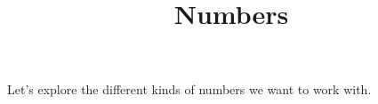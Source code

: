 \documentclass{ximera}
\title{Numbers}
\begin{document}
\begin{abstract}
\end{abstract}
\maketitle

Let's explore the different kinds of numbers we want to work with.
\end{document}
